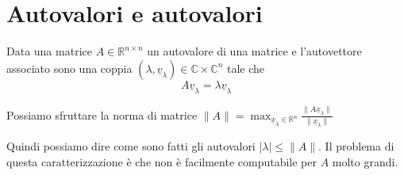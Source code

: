 \chapter{Autovalori e autovalori}

\begin{definizione} 
    Data una matrice $A\in \mathbb{R}^{n\times n}$ un autovalore di una matrice 
    e l'autovettore associato 
    sono una coppia $(\lambda, \underline{v}_\lambda)\in \mathbb{C}\times\mathbb{C}^{n}$
    tale che 
    $$A\underline{v}_\lambda = \lambda \underline{v}_\lambda $$
\end{definizione}

Possiamo sfruttare la norma di matrice $\|A\|=\max _{\underline{x}_\lambda\in \mathbb{R}^n}\frac{\|A\underline{x}_\lambda\|}{\|\underline{x}_\lambda\|} $

Quindi possiamo dire come sono fatti gli autovalori 
$|\lambda| \le \|A\|$. Il problema di questa caratterizzazione è che non è facilmente 
computabile per $A$ molto grandi.

